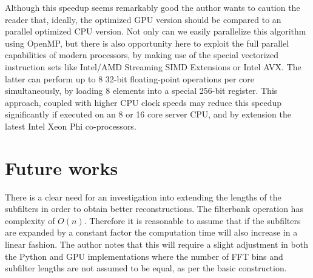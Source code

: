 \documentclass[a4paper,10pt]{article}
\begin{document}
Although this speedup seems remarkably good the author wants to caution the reader that, ideally, the optimized GPU version should be compared to an parallel optimized CPU
version. Not only can we easily parallelize this algorithm using OpenMP, but there is also opportunity here to exploit the full parallel capabilities of modern processors,
by making use of the special vectorized instruction sets like Intel/AMD Streaming SIMD Extensions or Intel AVX. The latter can perform up to 8 32-bit floating-point
operations per core simultaneously, by loading 8 elements into a special 256-bit register. This approach, coupled with higher CPU clock speeds may reduce this speedup 
significantly if executed on an 8 or 16 core server CPU, and by extension the latest Intel Xeon Phi co-processors.

\section{Future works}
There is a clear need for an investigation into extending the lengths of the subfilters in order to obtain better reconstructions. The filterbank operation has complexity of 
$O(n)$. Therefore it is reasonable to assume that if the subfilters are expanded by a constant factor the computation time will also increase in a linear fashion. The author 
notes that this will require a slight adjustment in both the Python and GPU implementations where the number of FFT bins and subfilter lengths are not assumed to be equal, 
as per the basic construction.
\pagebreak
{}

\end{document}
